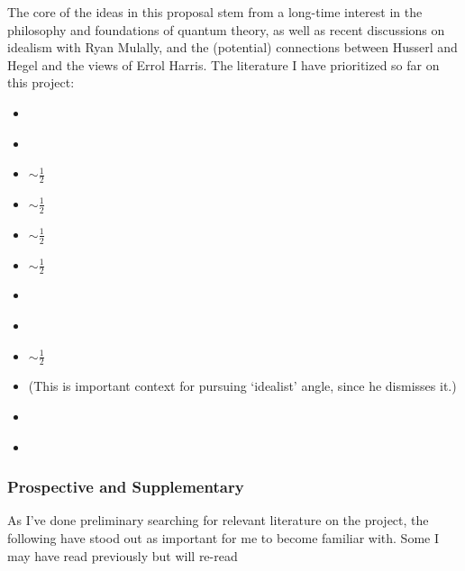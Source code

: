 The core of the ideas in this proposal stem from a long-time interest in the philosophy and foundations of quantum theory, as well as recent discussions on idealism with Ryan Mulally, and the (potential) connections between Husserl and Hegel and the views of Errol Harris.  The literature I have prioritized so far on this project:

\begin{itemize}
    \item \cite{Poincare1952} \checkmark
    \item \cite{Eddington1939} \checkmark
    \item \cite{Ryckman2005} $\sim \frac{1}{2}$
    \item \cite{Harris1965} $\sim \frac{1}{2}$
    \item \cite{Weyl1949} $\sim \frac{1}{2}$
    \item \cite{Cassirer1927} $\sim \frac{1}{2}$
    \item \cite{Riezler1940} \checkmark
    \item \cite{Carnap1966} \checkmark
    \item \cite{KantProlegomena} $\sim \frac{1}{2}$
    \item \cite{Psillos2001} \checkmark (This is important context for pursuing `idealist' angle, since he dismisses it.)
    \item \cite{Ney2021}
    \item \cite{Maudlin2019}
\end{itemize}


\subsubsection{Prospective and Supplementary}

As I've done preliminary searching for relevant literature on the project, the following have stood out as important for me to become familiar with. Some I may have read previously but will re-read

